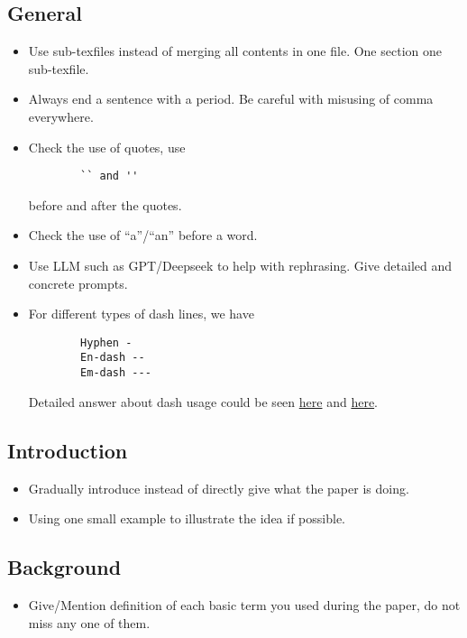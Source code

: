 \documentclass[acmsmall,screen,review]{acmart}
\begin{document}
\subsection{General}
\begin{itemize}
    \item Use sub-texfiles instead of merging all contents in one file. One section one sub-texfile.
    \item Always end a sentence with a period. Be careful with misusing of comma everywhere.
    \item Check the use of quotes, use
    \begin{verbatim}
        `` and ''
    \end{verbatim}
    \vspace{-\baselineskip}
    before and after the quotes.
    \item Check the use of ``a''/``an'' before a word.
    \item Use LLM such as GPT/Deepseek to help with rephrasing. Give detailed and concrete prompts.
    \item For different types of dash lines, we have
    \begin{verbatim}
        Hyphen -
        En-dash --
        Em-dash ---
    \end{verbatim}
    \vspace{-\baselineskip}
    Detailed answer about dash usage could be seen \href{https://tex.stackexchange.com/questions/53413/what-is-the-latex-command-for-em-dash}{here} and \href{https://www.reddit.com/r/writing/comments/vysrhj/comment/ig41u4x/?utm_source=share&utm_medium=web3x&utm_name=web3xcss&utm_term=1&utm_content=share_button}{here}.

\end{itemize}
\subsection{Introduction}
\begin{itemize}
    \item Gradually introduce instead of directly give what the paper is doing.
    \item Using one small example to illustrate the idea if possible.
\end{itemize}

\subsection{Background}
\begin{itemize}
    \item Give/Mention definition of each basic term you used during the paper, do not miss any one of them.
\end{itemize}
\end{document}
